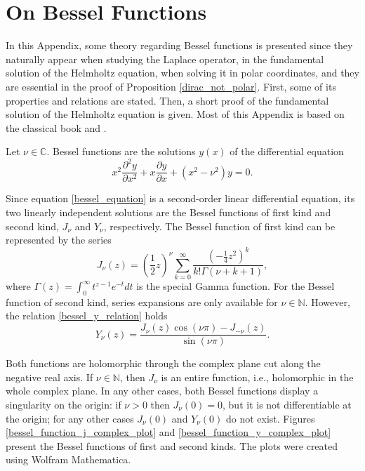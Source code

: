 \chapter{On Bessel Functions}\label{appendix_c_bessel}

In this Appendix, some theory regarding Bessel functions is presented since they naturally appear when studying the Laplace operator, in the fundamental solution of the Helmholtz equation, when solving it in polar coordinates, and they are essential in the proof of Proposition \ref{dirac_not_polar}. First, some of its properties and relations are stated. Then, a short proof of the fundamental solution of the Helmholtz equation is given. Most of this Appendix is based on the classical book \cite{abramowitz1988handbook} and \cite{chen2010boundary}.

Let \(\nu \in \mathbb{C}\). Bessel functions are the solutions \(y(x)\) of the differential equation
\begin{equation}\label{bessel_equation}
    x^2\frac{\partial^2 y}{\partial x^2} + x \frac{\partial y}{\partial x} + (x^2-\nu^2)y = 0.
\end{equation}

Since equation \eqref{bessel_equation} is a second-order linear differential equation, its two linearly independent solutions are the Bessel functions of first kind and second kind, \(J_\nu\) and \(Y_\nu\), respectively. The Bessel function of first kind can be represented by the series
\[
    J_\nu (z) = \left(\frac{1}{2}z\right)^\nu \sum_{k=0}^{\infty} \frac{\left(-\frac{1}{4}z^2\right)^k}{k! \Gamma(\nu+k+1)},
\]
where \(\Gamma(z) = \int_0^\infty t^{z-1} e^{-t}dt\) is the special Gamma function. For the Bessel function of second kind, series expansions are only available for \(\nu \in \mathbb{N}\). However, the relation \eqref{bessel_y_relation} holds
\begin{equation}\label{bessel_y_relation}
    Y_\nu(z) = \frac{J_\nu(z) \cos(\nu \pi) - J_{-\nu}(z)}{\sin(\nu \pi)}.
\end{equation}

Both functions are holomorphic through the complex plane cut along the negative real axis. If \(\nu \in \mathbb{N}\), then \(J_\nu\) is an entire function, i.e., holomorphic in the whole complex plane. In any other cases, both Bessel functions display a singularity on the origin: if \(\nu > 0\) then \(J_\nu(0)=0\), but it is not differentiable at the origin; for any other cases \(J_\nu(0)\) and \(Y_\nu(0)\) do not exist. Figures \ref{bessel_function_j_complex_plot} and \ref{bessel_function_y_complex_plot} present the Bessel functions of first and second kinds. The plots were created using Wolfram Mathematica.

